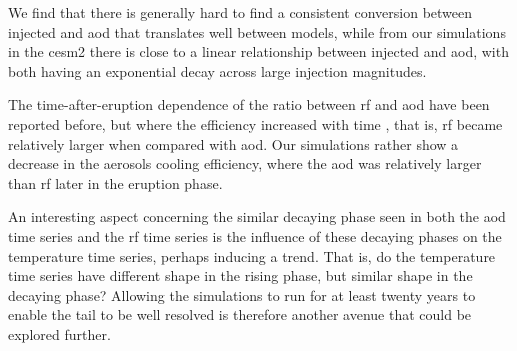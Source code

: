 \documentclass{ametsocV6.1}
\newcommand{\iso}[1][i]{{#1}njected \ce{SO2}}
\begin{document}
We find that there is generally hard to find a consistent conversion between \iso{} and
\gls{aod} that translates well between models, while from our simulations in the
\gls{cesm2} there is close to a linear relationship between \iso{} and \gls{aod}, with
both having an exponential decay across large injection magnitudes.

The time-after-eruption dependence of the ratio between \gls{rf} and \gls{aod} have been
reported before, but where the efficiency increased with time \citep{marshall2020}, that
is, \gls{rf} became relatively larger when compared with \gls{aod}. Our simulations
rather show a decrease in the aerosols cooling efficiency, where the \gls{aod} was
relatively larger than \gls{rf} later in the eruption phase.

An interesting aspect concerning the similar decaying phase seen in both the \gls{aod}
time series and the \gls{rf} time series is the influence of these decaying phases on
the temperature time series, perhaps inducing a trend. That is, do the temperature time
series have different shape in the rising phase, but similar shape in the decaying
phase? Allowing the simulations to run for at least twenty years to enable the tail to
be well resolved is therefore another avenue that could be explored further.

\clearpage
\acknowledgments{}

%
%
\datastatement{}
\end{document}
